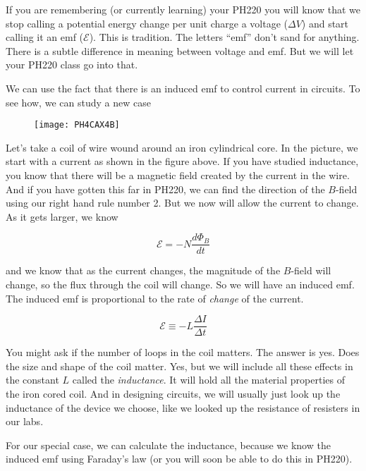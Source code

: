 If you are remembering (or currently learning) your PH220 you will know that we stop calling a potential energy change per unit charge a voltage ($\Delta V$) and start calling it an emf ($\mathcal{E}$). This is tradition. The letters ``emf'' don't sand for anything.  There is a subtle difference in meaning between voltage and emf.  But we will let your PH220 class go into that.

We can use the fact that there is an induced emf to control current in circuits. To see how, we can study a new case

\begin{figure}[h!]
	\centering
	\texttt{[image: PH4CAX4B]}
\end{figure}

Let's take a coil of wire wound around an iron cylindrical core. In the picture, we start with a current as shown in the figure above. If you have studied inductance, you know that there will be a magnetic field created by the current in the wire. And if you have gotten this far in PH220, we can find the direction of the $B$-field using our right hand rule number 2. But we now will allow the current to change. As it gets larger, we know 

\begin{equation*}
	\mathcal{E}=-N\frac{d\Phi _{B}}{dt}
\end{equation*}

\noindent and we know that as the current changes, the magnitude of the $B$-field will change, so the flux through the coil will change. So we will have an induced emf. The induced emf is proportional to the rate of \emph{change} of the current.

\begin{equation*}
	\mathcal{E}\equiv -L\frac{\Delta I}{\Delta t}
\end{equation*}

You might ask if the number of loops in the coil matters. The answer is yes. Does the size and shape of the coil matter. Yes, but we will include all these effects in the constant $L$ called the \emph{inductance}. It will hold all the material properties of the iron cored coil. And in designing circuits, we will usually just look up the inductance of the device we choose, like we looked up the resistance of resisters in our labs.

For our special case, we can calculate the inductance, because we know the induced emf using Faraday's law (or you will soon be able to do this in PH220).

